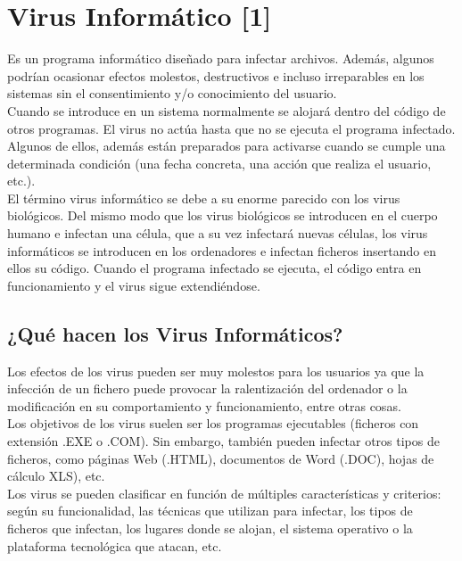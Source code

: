 \documentclass[12pt,a4paper]{article}
\begin{document}
	\section{Virus Informático [1]}
	
	Es un programa informático diseñado para infectar archivos. Además, algunos podrían ocasionar efectos molestos, destructivos e incluso irreparables en los sistemas sin el consentimiento y/o conocimiento del usuario.\\
	
	Cuando se introduce en un sistema normalmente se alojará dentro del código de otros programas. El virus no actúa hasta que no se ejecuta el programa infectado. Algunos de ellos, además están preparados para activarse cuando se cumple una determinada condición (una fecha concreta, una acción que realiza el usuario, etc.).\\
	
	El término virus informático se debe a su enorme parecido con los virus biológicos. Del mismo modo que los virus biológicos se introducen en el cuerpo humano e infectan una célula, que a su vez infectará nuevas células, los virus informáticos se introducen en los ordenadores e infectan ficheros insertando en ellos su código. Cuando el programa infectado se ejecuta, el código entra en funcionamiento y el virus sigue extendiéndose.
	
	\subsection{¿Qué hacen los Virus Informáticos?}
	
	Los efectos de los virus pueden ser muy molestos para los usuarios ya que la infección de un fichero puede provocar la ralentización del ordenador o la modificación en su comportamiento y funcionamiento, entre otras cosas.\\
	
	Los objetivos de los virus suelen ser los programas ejecutables (ficheros con extensión .EXE o .COM). Sin embargo, también pueden infectar otros tipos de ficheros, como páginas Web (.HTML), documentos de Word (.DOC), hojas de cálculo XLS), etc.\\
	
	Los virus se pueden clasificar en función de múltiples características y criterios: según su funcionalidad, las técnicas que utilizan para infectar, los tipos de ficheros que infectan, los lugares donde se alojan, el sistema operativo o la plataforma tecnológica que atacan, etc.
	
\end{document}

